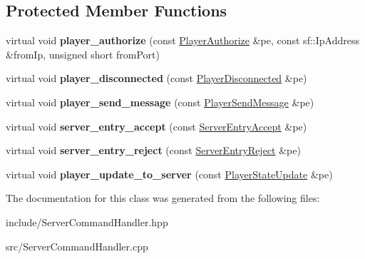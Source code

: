 \subsection*{Protected Member Functions}
\begin{DoxyCompactItemize}
\item 
\hypertarget{class_server_command_handler_a20d91d940ecf08b92b7be38955cd70d1}{virtual void {\bfseries player\-\_\-authorize} (const \hyperlink{class_player_authorize}{Player\-Authorize} \&pe, const sf\-::\-Ip\-Address \&from\-Ip, unsigned short from\-Port)}\label{class_server_command_handler_a20d91d940ecf08b92b7be38955cd70d1}

\item 
\hypertarget{class_server_command_handler_a976eb94c615e3bbb29f0f0312b4ee908}{virtual void {\bfseries player\-\_\-disconnected} (const \hyperlink{class_player_disconnected}{Player\-Disconnected} \&pe)}\label{class_server_command_handler_a976eb94c615e3bbb29f0f0312b4ee908}

\item 
\hypertarget{class_server_command_handler_a99972523ad0a0b7ea677c4ccd99dc48b}{virtual void {\bfseries player\-\_\-send\-\_\-message} (const \hyperlink{class_player_send_message}{Player\-Send\-Message} \&pe)}\label{class_server_command_handler_a99972523ad0a0b7ea677c4ccd99dc48b}

\item 
\hypertarget{class_server_command_handler_aeddc33b88773e622c95c70193724e239}{virtual void {\bfseries server\-\_\-entry\-\_\-accept} (const \hyperlink{class_server_entry_accept}{Server\-Entry\-Accept} \&pe)}\label{class_server_command_handler_aeddc33b88773e622c95c70193724e239}

\item 
\hypertarget{class_server_command_handler_a6f688191f3dc1da888a7f405440ce3a0}{virtual void {\bfseries server\-\_\-entry\-\_\-reject} (const \hyperlink{class_server_entry_reject}{Server\-Entry\-Reject} \&pe)}\label{class_server_command_handler_a6f688191f3dc1da888a7f405440ce3a0}

\item 
\hypertarget{class_server_command_handler_a8ebb5957fd6d83f63d6034805577fcf2}{virtual void {\bfseries player\-\_\-update\-\_\-to\-\_\-server} (const \hyperlink{class_player_state_update}{Player\-State\-Update} \&pe)}\label{class_server_command_handler_a8ebb5957fd6d83f63d6034805577fcf2}

\end{DoxyCompactItemize}


The documentation for this class was generated from the following files\-:\begin{DoxyCompactItemize}
\item 
include/Server\-Command\-Handler.\-hpp\item 
src/Server\-Command\-Handler.\-cpp\end{DoxyCompactItemize}
